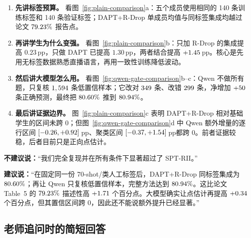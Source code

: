 \documentclass[UTF8,zihao=-4,a4paper]{ctexart}
\newcommand{\pp}{\,pp}
\begin{document}
\begin{enumerate}[leftmargin=2.2em,itemsep=0.45em]
  \item \textbf{先讲标签预算。} 看图~\ref{fig:plain-comparison}a：五个成员使用相同的 140 条训练标签和 140 条验证标签；DAPT+R-Drop 单成员均值与同标签集成均越过论文 $79.23\%$ 报告点。
  \item \textbf{再讲学生为什么变强。} 看图~\ref{fig:plain-comparison}b：只加 R-Drop 的集成提高 $0.23$\pp，只做 DAPT 已提高 $1.30$\pp，两者结合提高 $+1.45$\pp。核心是先用无标签数据熟悉直播语言，再用一致性训练降低波动。
  \item \textbf{然后讲大模型怎么用。} 看图~\ref{fig:qwen-gate-comparison}b--c：Qwen 不做所有题，只复核 $1,594$ 条低置信样本；它改对 $349$ 条、改错 $299$ 条，净增加 $+50$ 条正确预测，最终把 $80.60\%$ 推到 $80.94\%$。
  \item \textbf{最后讲证据边界。} 图~\ref{fig:plain-comparison}c 表明 DAPT+R-Drop 相对基础学生的区间未跨 0；但图~\ref{fig:qwen-gate-comparison}d 中 Qwen 额外增量的逐行区间 $[-0.26,+0.92]$\pp、聚类区间 $[-0.37,+1.54]$\pp 都跨 0。前者证据较稳，后者目前只是正向点估计。
\end{enumerate}

\begin{warningbox}[最容易讲错的地方]
\textbf{不建议说：}“我们完全复现并在所有条件下显著超过了 SPT-RII。”

\textbf{建议说：}“在固定同一份 70-shot/类人工标签后，DAPT+R-Drop 同标签集成为 $80.60\%$；再让 Qwen 只复核低置信样本，完整方法达到 $80.94\%$。这比论文 Table~5 的 $79.23\%$ 描述性高 $+1.71$ 个百分点。大模型确实让点估计再提高 $+0.34$ 个百分点，但其置信区间跨 0，因此还不能说额外提升已经显著。”
\end{warningbox}

\subsection{老师追问时的简短回答}
\end{document}
